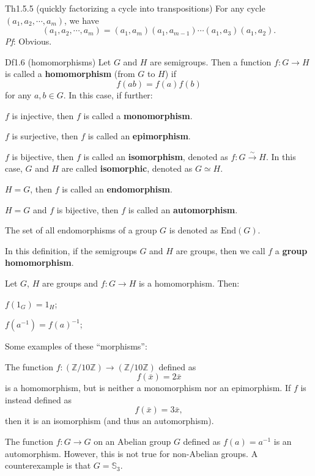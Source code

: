 \documentclass{article}
\begin{document}
\begin{Th}{Th1.5.5 (quickly factorizing a cycle into transpositions)}
    For any cycle $(a_1, a_2, \cdots, a_m)$, we have
    $$ (a_1, a_2, \cdots, a_m) = (a_1, a_m)(a_1, a_{m-1})\cdots(a_1, a_3)(a_1, a_2). $$
    \tcblower
    \textit{Pf}: Obvious.
\end{Th}

\begin{Df}{Df1.6 (homomorphisms)}
    Let $G$ and $H$ are semigroups. Then a function $f: G\to H$ is called a \textbf{homomorphism} (from $G$ to $H$) if 
    $$ f(ab) = f(a)f(b) $$
    for any $a, b\in G$. In this case, if further:
    \begin{compactenum}
        \item $f$ is injective, then $f$ is called a \textbf{monomorphism}.
        \item $f$ is surjective, then $f$ is called an \textbf{epimorphism}.
        \item $f$ is bijective, then $f$ is called an \textbf{isomorphism}, denoted as $f: G\overset{\sim}{\to} H$. In this case, $G$ and $H$ are called \textbf{isomorphic}, denoted as $G\simeq H$.
        \item $H = G$, then $f$ is called an \textbf{endomorphism}.
        \item $H = G$ and $f$ is bijective, then $f$ is called an \textbf{automorphism}.
    \end{compactenum}
    The set of all endomorphisms of a group $G$ is denoted as $\text{End}(G)$.
\end{Df}

\begin{Rmk}{}
    \textcolor{Df}{In this definition, if the semigroups $G$ and $H$ are groups, then we call $f$ a \textbf{group homomorphism}.}
    \textcolor{Th}{Let $G$, $H$ are groups and $f: G\to H$ is a homomorphism. Then:
    \begin{compactenum}
        \item $f(1_G) = 1_H$;
        \item $f(a^{-1}) = f(a)^{-1}$;
    \end{compactenum}}
    \textcolor{Th}{Some examples of these ``morphisms'':
    \begin{compactenum}
        \item The function $f: (\mathbb{Z}/10\mathbb{Z})\to (\mathbb{Z}/10\mathbb{Z})$ defined as
        $$ f(\bar{x}) = 2\bar{x} $$
        is a homomorphism, but is neither a monomorphism nor an epimorphism. If $f$ is instead defined as
        $$ f(\bar{x}) = 3\bar{x}, $$
        then it is an isomorphism (and thus an automorphism).
        \item The function $f: G\to G$ on an Abelian group $G$ defined as $f(a) = a^{-1}$ is an automorphism. However, this is not true for non-Abelian groups. A counterexample is that $G = \mathbb{S}_3$.
    \end{compactenum}}
\end{Rmk}
\end{document}
